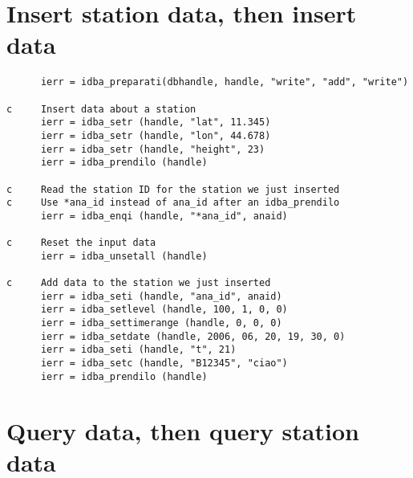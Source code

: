 \documentclass[final,12pt,a4paper,twoside]{book}
\begin{document}

\section{Insert station data, then insert data}

\begin{verbatim}
      ierr = idba_preparati(dbhandle, handle, "write", "add", "write")
      
c     Insert data about a station
      ierr = idba_setr (handle, "lat", 11.345)
      ierr = idba_setr (handle, "lon", 44.678)
      ierr = idba_setr (handle, "height", 23)
      ierr = idba_prendilo (handle)

c     Read the station ID for the station we just inserted
c     Use *ana_id instead of ana_id after an idba_prendilo
      ierr = idba_enqi (handle, "*ana_id", anaid)

c     Reset the input data
      ierr = idba_unsetall (handle)

c     Add data to the station we just inserted
      ierr = idba_seti (handle, "ana_id", anaid)
      ierr = idba_setlevel (handle, 100, 1, 0, 0)
      ierr = idba_settimerange (handle, 0, 0, 0)
      ierr = idba_setdate (handle, 2006, 06, 20, 19, 30, 0)
      ierr = idba_seti (handle, "t", 21)
      ierr = idba_setc (handle, "B12345", "ciao")
      ierr = idba_prendilo (handle)
\end{verbatim}


\section{Query data, then query station data}
\end{document}
